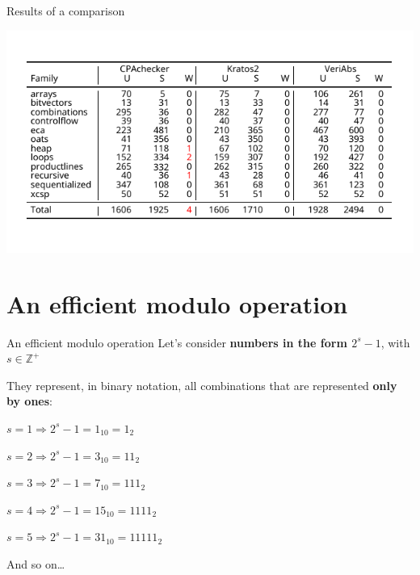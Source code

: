 \documentclass[aspectratio=1610,10.5pt]{beamer} %
\begin{document}
\begin{frame}{Results of a comparison}
    \begin{center}
        \includegraphics[height=%
        0.85\textheight]{../res/comparison-paper}
    \end{center}
\end{frame}

\section{An efficient modulo operation}

\begin{frame}{An efficient modulo operation}
    Let's consider \textbf{numbers in the form $2^{s}-1$}, with $s \in \mathbb{Z}^{+}$

    \medskip

    They represent, in binary notation, all combinations that are represented \textbf{only by ones}:

    \bigskip

    $s = 1 \Rightarrow 2^s-1 = 1_{10} = 1_2$

    \smallskip

    $s = 2 \Rightarrow 2^s-1 = 3_{10} = 11_2$

    \smallskip

    $s = 3 \Rightarrow 2^s-1 = 7_{10} = 111_2$

    \smallskip

    $s = 4 \Rightarrow 2^s-1 = 15_{10} = 1111_2$

    \smallskip

    $s = 5 \Rightarrow 2^s-1 = 31_{10} = 11111_2$

    \bigskip

    And so on\ldots
\end{frame}
\end{document}
